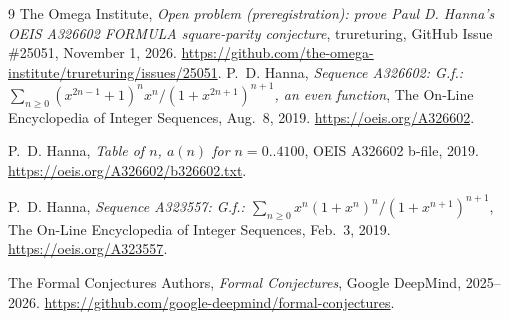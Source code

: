 \documentclass[11pt,a4paper]{article}
\theoremstyle{definition}
\theoremstyle{remark}
\begin{document}
\begin{thebibliography}{9}
The Omega Institute, \emph{Open problem (preregistration): prove Paul D. Hanna's OEIS A326602 FORMULA square-parity conjecture}, trureturing, GitHub Issue \#25051, November 1, 2026. \url{https://github.com/the-omega-institute/trureturing/issues/25051}.
P.~D. Hanna, \emph{Sequence A326602: G.f.: $\sum_{n\ge 0} (x^{2n-1}+1)^n x^n / (1+x^{2n+1})^{n+1}$, an even function}, The On-Line Encyclopedia of Integer Sequences, Aug.~8, 2019. \url{https://oeis.org/A326602}.

P.~D. Hanna, \emph{Table of $n$, $a(n)$ for $n = 0..4100$}, OEIS A326602 b-file, 2019. \url{https://oeis.org/A326602/b326602.txt}.

P.~D. Hanna, \emph{Sequence A323557: G.f.: $\sum_{n\ge 0} x^n (1+x^n)^n / (1+x^{n+1})^{n+1}$}, The On-Line Encyclopedia of Integer Sequences, Feb.~3, 2019. \url{https://oeis.org/A323557}.

The Formal Conjectures Authors, \emph{Formal Conjectures}, Google DeepMind, 2025--2026. \url{https://github.com/google-deepmind/formal-conjectures}.
\end{thebibliography}
\end{document}
